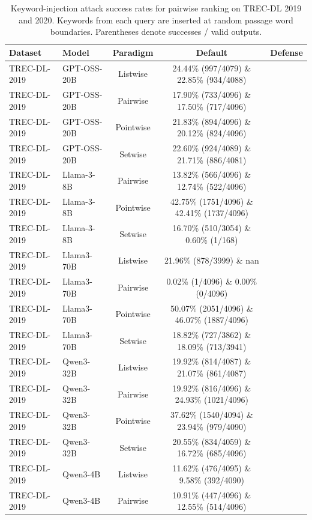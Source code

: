 \begin{table}[t]
\centering
\small
\caption{Keyword-injection attack success rates for pairwise ranking on TREC-DL 2019 and 2020. Keywords from each query are inserted at random passage word boundaries. Parentheses denote successes / valid outputs.}
\label{tab:trec-dl-keyword-injection}
\begin{tabular}{ll*{3}{c}}
\toprule
\textbf{Dataset} & \textbf{Model} & \textbf{Paradigm} & \textbf{Default} & \textbf{Defense} \\
\midrule
TREC-DL-2019 & GPT-OSS-20B & Listwise & 24.44\% (997/4079) \& 22.85\% (934/4088) \\
TREC-DL-2019 & GPT-OSS-20B & Pairwise & 17.90\% (733/4096) \& 17.50\% (717/4096) \\
TREC-DL-2019 & GPT-OSS-20B & Pointwise & 21.83\% (894/4096) \& 20.12\% (824/4096) \\
TREC-DL-2019 & GPT-OSS-20B & Setwise & 22.60\% (924/4089) \& 21.71\% (886/4081) \\
TREC-DL-2019 & Llama-3-8B & Pairwise & 13.82\% (566/4096) \& 12.74\% (522/4096) \\
TREC-DL-2019 & Llama-3-8B & Pointwise & 42.75\% (1751/4096) \& 42.41\% (1737/4096) \\
TREC-DL-2019 & Llama-3-8B & Setwise & 16.70\% (510/3054) \& 0.60\% (1/168) \\
TREC-DL-2019 & Llama3-70B & Listwise & 21.96\% (878/3999) \& nan \\
TREC-DL-2019 & Llama3-70B & Pairwise & 0.02\% (1/4096) \& 0.00\% (0/4096) \\
TREC-DL-2019 & Llama3-70B & Pointwise & 50.07\% (2051/4096) \& 46.07\% (1887/4096) \\
TREC-DL-2019 & Llama3-70B & Setwise & 18.82\% (727/3862) \& 18.09\% (713/3941) \\
TREC-DL-2019 & Qwen3-32B & Listwise & 19.92\% (814/4087) \& 21.07\% (861/4087) \\
TREC-DL-2019 & Qwen3-32B & Pairwise & 19.92\% (816/4096) \& 24.93\% (1021/4096) \\
TREC-DL-2019 & Qwen3-32B & Pointwise & 37.62\% (1540/4094) \& 23.94\% (979/4090) \\
TREC-DL-2019 & Qwen3-32B & Setwise & 20.55\% (834/4059) \& 16.72\% (685/4096) \\
TREC-DL-2019 & Qwen3-4B & Listwise & 11.62\% (476/4095) \& 9.58\% (392/4090) \\
TREC-DL-2019 & Qwen3-4B & Pairwise & 10.91\% (447/4096) \& 12.55\% (514/4096) \\

\end{tabular}
\end{table}
